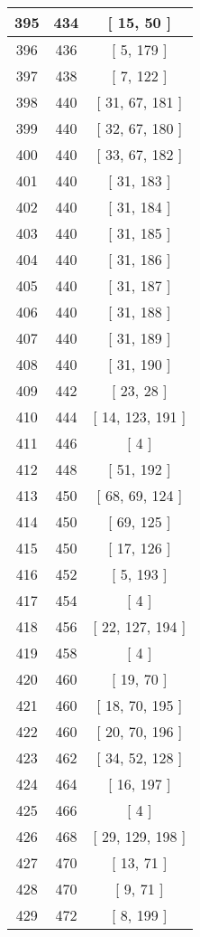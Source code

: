 \begin{center}
\begin{longtable}[H]{|| c c c ||}
\hline
395 & 434 & [ 15, 50 ] \\ 
\hline
396 & 436 & [ 5, 179 ] \\ 
\hline
397 & 438 & [ 7, 122 ] \\ 
\hline
398 & 440 & [ 31, 67, 181 ] \\ 
\hline
399 & 440 & [ 32, 67, 180 ] \\ 
\hline
400 & 440 & [ 33, 67, 182 ] \\ 
\hline
401 & 440 & [ 31, 183 ] \\ 
\hline
402 & 440 & [ 31, 184 ] \\ 
\hline
403 & 440 & [ 31, 185 ] \\ 
\hline
404 & 440 & [ 31, 186 ] \\ 
\hline
405 & 440 & [ 31, 187 ] \\ 
\hline
406 & 440 & [ 31, 188 ] \\ 
\hline
407 & 440 & [ 31, 189 ] \\ 
\hline
408 & 440 & [ 31, 190 ] \\ 
\hline
409 & 442 & [ 23, 28 ] \\ 
\hline
410 & 444 & [ 14, 123, 191 ] \\ 
\hline
411 & 446 & [ 4 ] \\ 
\hline
412 & 448 & [ 51, 192 ] \\ 
\hline
413 & 450 & [ 68, 69, 124 ] \\ 
\hline
414 & 450 & [ 69, 125 ] \\ 
\hline
415 & 450 & [ 17, 126 ] \\ 
\hline
416 & 452 & [ 5, 193 ] \\ 
\hline
417 & 454 & [ 4 ] \\ 
\hline
418 & 456 & [ 22, 127, 194 ] \\ 
\hline
419 & 458 & [ 4 ] \\ 
\hline
420 & 460 & [ 19, 70 ] \\ 
\hline
421 & 460 & [ 18, 70, 195 ] \\ 
\hline
422 & 460 & [ 20, 70, 196 ] \\ 
\hline
423 & 462 & [ 34, 52, 128 ] \\ 
\hline
424 & 464 & [ 16, 197 ] \\ 
\hline
425 & 466 & [ 4 ] \\ 
\hline
426 & 468 & [ 29, 129, 198 ] \\ 
\hline
427 & 470 & [ 13, 71 ] \\ 
\hline
428 & 470 & [ 9, 71 ] \\ 
\hline
429 & 472 & [ 8, 199 ] \\ 

\end{longtable}
\end{center}
